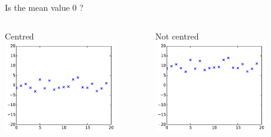 \documentclass{beamer}
\begin{document}
\begin{frame}{}
 Is the mean value 0 ?\\
\vspace{5mm}
\begin{columns}[c]
\column{5cm}
\begin{center}
Centred
\includegraphics[height=4cm]{figures/2_centred}
\end{center}
\column{5cm}
\begin{center}
Not centred
\includegraphics[height=4cm]{figures/2_centredno}
\end{center}
\end{columns}
\end{frame}
\end{document}

